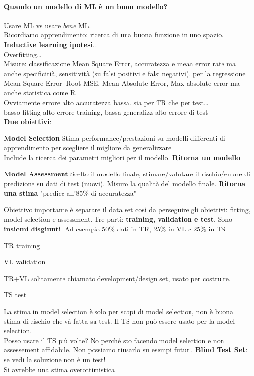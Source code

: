 \documentclass[10pt]{book}
\begin{document}
\paragraph{Quando un modello di ML è un buon modello?} Usare ML vs usare \textit{bene} ML.\\
Ricordiamo apprendimento: ricerca di una buona funzione in uno spazio.\\
\textbf{Inductive learning ipotesi}\ldots\\ %
Overfitting\ldots\\ %
Misure: classificazione Mean Square Error, accuratezza e mean error rate ma anche specificitià, sensitività (su falsi positivi e falsi negativi), per la regressione Mean Square Error, Root MSE, Mean Absolute Error, Max absolute error ma anche statistica come R\\
Ovviamente errore alto accuratezza bassa. sia per TR che per test\ldots\\basso fitting alto errore training, bassa generalizz alto errore di test\\
\textbf{Due obiettivi}:
\begin{list}{}{}
	\item  \textbf{Model Selection} Stima performance/prestazioni su modelli differenti di apprendimento per scegliere il migliore da generalizzare\\
	Include la ricerca dei parametri migliori per il modello. \textbf{Ritorna un modello}
	\item \textbf{Model Assessment} Scelto il modello finale, stimare/valutare il rischio/errore di predizione su dati di test (nuovi). Misuro la qualità del modello finale. \textbf{Ritorna una stima} "predice all'85\% di accuratezza"
\end{list}
Obiettivo importante è separare il data set così da perseguire gli obiettivi: fitting, model selection e assessment. Tre parti: \textbf{training, validation e test}. Sono \textbf{insiemi disgiunti}. Ad esempio 50\% dati in TR, 25\% in VL e 25\% in TS.
\begin{list}{}{}
	\item TR training
	\item VL validation
	\item TR+VL solitamente chiamato development/design set, usato per costruire.
	\item TS test
\end{list}
La stima in model selection è solo per scopi di model selection, non è buona stima di rischio che và fatta su test. Il TS non può essere usato per la model selection.\\Posso usare il TS più volte? No perché sto facendo model selection e non assessement affidabile. Non possiamo riusarlo su esempi futuri. \textbf{Blind Test Set}: se vedi la soluzione non è un test!\\Si avrebbe una stima overottimistica\\
\end{document}

